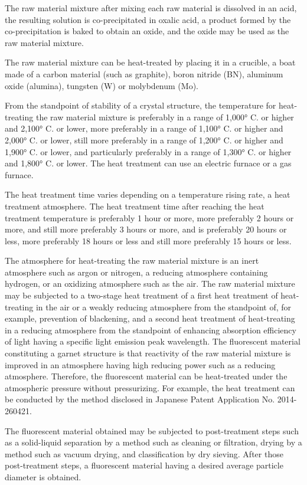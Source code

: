 \documentclass[11pt,a4paper]{article}
\begin{document}
The raw material mixture after mixing each raw material is dissolved in an acid, the resulting solution is co-precipitated in oxalic acid, a product formed by the co-precipitation is baked to obtain an oxide, and the oxide may be used as the raw material mixture.

The raw material mixture can be heat-treated by placing it in a crucible, a boat made of a carbon material (such as graphite), boron nitride (BN), aluminum oxide (alumina), tungsten (W) or molybdenum (Mo).

From the standpoint of stability of a crystal structure, the temperature for heat-treating the raw material mixture is preferably in a range of 1,000° C. or higher and 2,100° C. or lower, more preferably in a range of 1,100° C. or higher and 2,000° C. or lower, still more preferably in a range of 1,200° C. or higher and 1,900° C. or lower, and particularly preferably in a range of 1,300° C. or higher and 1,800° C. or lower. The heat treatment can use an electric furnace or a gas furnace.

The heat treatment time varies depending on a temperature rising rate, a heat treatment atmosphere. The heat treatment time after reaching the heat treatment temperature is preferably 1 hour or more, more preferably 2 hours or more, and still more preferably 3 hours or more, and is preferably 20 hours or less, more preferably 18 hours or less and still more preferably 15 hours or less.

The atmosphere for heat-treating the raw material mixture is an inert atmosphere such as argon or nitrogen, a reducing atmosphere containing hydrogen, or an oxidizing atmosphere such as the air. The raw material mixture may be subjected to a two-stage heat treatment of a first heat treatment of heat-treating in the air or a weakly reducing atmosphere from the standpoint of, for example, prevention of blackening, and a second heat treatment of heat-treating in a reducing atmosphere from the standpoint of enhancing absorption efficiency of light having a specific light emission peak wavelength. The fluorescent material constituting a garnet structure is that reactivity of the raw material mixture is improved in an atmosphere having high reducing power such as a reducing atmosphere. Therefore, the fluorescent material can be heat-treated under the atmospheric pressure without pressurizing. For example, the heat treatment can be conducted by the method disclosed in Japanese Patent Application No. 2014-260421.

The fluorescent material obtained may be subjected to post-treatment steps such as a solid-liquid separation by a method such as cleaning or filtration, drying by a method such as vacuum drying, and classification by dry sieving. After those post-treatment steps, a fluorescent material having a desired average particle diameter is obtained.
\end{document}
